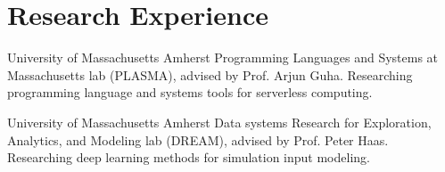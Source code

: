 \section{Research Experience}

%
{University of Massachusetts Amherst}%
{}%
{}%
{Programming Languages and Systems at Massachusetts lab (PLASMA), advised by Prof.
Arjun Guha. Researching programming language and systems tools for serverless
computing.
%
\newline{}
}

%
{University of Massachusetts Amherst}%
{}%
{}%
{Data systems Research for Exploration, Analytics, and Modeling lab (DREAM),
advised by Prof. Peter Haas. Researching deep learning methods for simulation input
modeling.
%
}